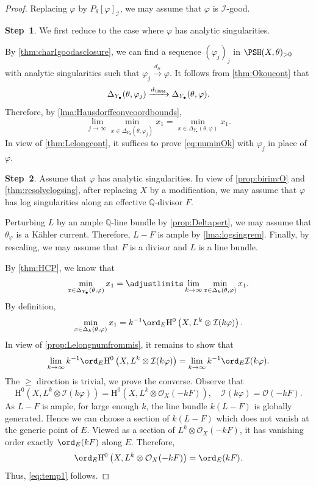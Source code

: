\begin{proof}
Replacing $\varphi$ by $P_{\theta}[\varphi]_{\mathcal{I}}$, we may assume that $\varphi$ is $\mathcal{I}$-good.

\textbf{Step~1}. We first reduce to the case where $\varphi$ has analytic singularities.

By \cref{thm:charIgoodasclosure}, we can find a sequence $(\varphi_j)_j$ in $\PSH(X,\theta)_{>0}$ with analytic singularities such that $\varphi_j\xrightarrow{d_S}\varphi$. It follows from \cref{thm:Okoucont} that
\[
\Delta_{Y_{\bullet}}(\theta,\varphi_j)\xrightarrow{d_{\Haus}}\Delta_{Y_{\bullet}}(\theta,\varphi).
\]
Therefore, by \cref{lma:Hausdorffconvcoordbounds},
\[
\lim_{j\to\infty}\min_{x\in \Delta_{Y_{\bullet}}(\theta,\varphi_j)}x_1=\min_{x\in \Delta_{Y_{\bullet}}(\theta,\varphi)}x_1.
\]
In view of \cref{thm:Lelongcont}, it suffices to prove \eqref{eq:numinOk} with $\varphi_j$ in place of $\varphi$.

\textbf{Step~2}. Assume that $\varphi$ has analytic singularities. In view of \cref{prop:birinvO} and \cref{thm:resolvelogsing}, after replacing $X$ by a modification, we may assume that $\varphi$ has log singularities along an effective $\mathbb{Q}$-divisor $F$.


Perturbing $L$ by an ample $\mathbb{Q}$-line bundle by \cref{prop:Deltapert}, we may assume that $\theta_{\varphi}$ is a Kähler current. Therefore, $L-F$ is ample by \cref{lma:logsingrem}.
Finally, by rescaling, we may assume that $F$ is a divisor and $L$ is a line bundle.

	By \cref{thm:HCP}, we know that
	\[
		\min_{x\in \Delta_{Y_{\bullet}}(\theta,\varphi)}x_1=\adjustlimits\lim_{k\to\infty}\min_{x\in \Delta_k(\theta,\varphi)}x_1.
	\]
	By definition,
	\[
		\min_{x\in \Delta_k(\theta,\varphi)}x_1=k^{-1}\ord_E \mathrm{H}^0\left(X,L^k\otimes \mathcal{I}(k\varphi)\right).
	\]
	In view of \cref{prop:Lelongnumfrommis}, it remains to show that
	\begin{equation}\label{eq:temp1}
		\lim_{k\to\infty}k^{-1}\ord_E \mathrm{H}^0\left(X,L^k\otimes \mathcal{I}(k\varphi)\right)=\lim_{k\to\infty}k^{-1}\ord_E \mathcal{I}(k\varphi).
	\end{equation}
	The $\geq$ direction is trivial, we prove the converse. Observe that
	\[
		\mathrm{H}^0\left(X,L^k\otimes \mathcal{I}(k\varphi)\right)=\mathrm{H}^0\left(X,L^k\otimes \mathcal{O}_X(-kF)\right),\quad \mathcal{I}(k\varphi)=\mathcal{O}(-kF).
	\]
	As $L-F$ is ample, for large enough $k$, the line bundle $k(L-F)$ is globally generated. Hence we can choose a section of $k(L-F)$ which does not vanish at the generic point of $E$. Viewed as a section of $L^k\otimes\mathcal O_X(-kF)$, it has vanishing order exactly $\ord_E(kF)$ along $E$. Therefore,
	\[
		\ord_E  \mathrm{H}^0\left(X,L^k\otimes \mathcal{O}_X(-kF)\right)=\ord_E(kF).
	\]
	Thus, \eqref{eq:temp1} follows.
\end{proof}





